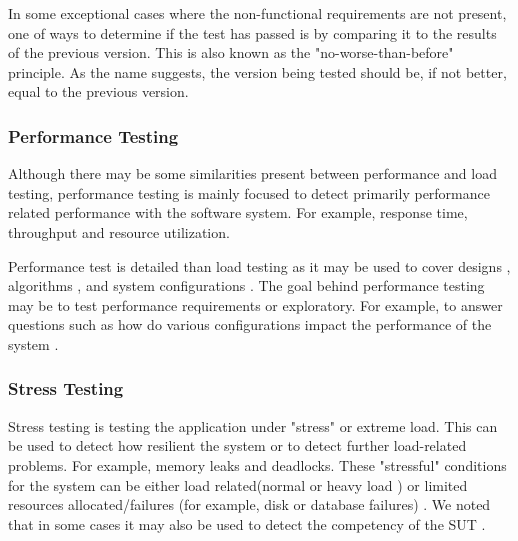 In some exceptional cases where the non-functional requirements are not present, one of ways to determine if the test has passed is by comparing it to the results of the previous version. This is also known as the "no-worse-than-before" principle. As the name suggests, the version being tested should be, if not better, equal to the previous version. \cite{Dumke:2001}

\subsubsection{Performance Testing}

Although there may be some similarities present between performance and load testing, performance testing is mainly focused to detect primarily performance related performance with the software system. For example, response time, throughput and resource utilization. \cite{Barna:2011,6032540,Gorton}

Performance test is detailed than load testing as it may be used to cover designs \cite{csurgay1999performance,denaro2004early,denaro2005performance}, algorithms \cite{cangussu2009segment,cangussu2007reducing}, and system configurations \cite{hoskins2005software,pozin2011models,sopitkamol2005method}. The goal behind performance testing may be to test performance requirements \cite{pozin2011models} or exploratory. For example, to answer questions such as how do various configurations impact the performance of the system \cite{Menasce:2000,Menasce:1994,Menasce:2001,pozin2011models}.

\subsubsection{Stress Testing}

Stress testing is testing the application under "stress" or extreme load. This can be used to detect how resilient the system or to detect further load-related problems. For example, memory leaks and deadlocks. These "stressful" conditions for the system can be either load related(normal \cite{zhang2002automated,kalita2011investigation,chakravarty2010stress} or heavy load \cite{Dillenseger2009,kalita2011investigation,huebner2001performance}) or limited resources allocated/failures (for example, disk or database failures) \cite{acharya2009mining}. We noted that in some cases it may also be used to detect the competency of the SUT \cite{garousi2010genetic,garousi2008empirical,garousi2006traffic,garousi2008traffic}.


